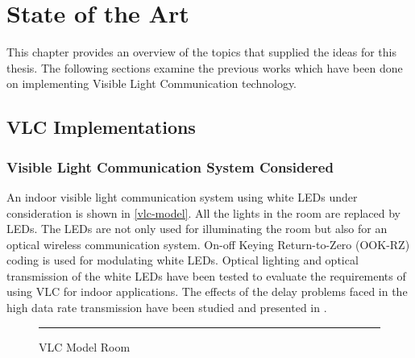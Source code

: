 
\chapter{State of the Art} %

\label{SoA} %


This chapter provides an overview of the topics that supplied the ideas for this thesis. The
following sections examine the previous works which have been done on implementing
Visible Light Communication technology.


\section{VLC Implementations}

\subsection{Visible Light Communication System Considered}

An indoor visible light communication system using white LEDs under consideration is
shown in \ref{vlc-model}. All the lights in the room are replaced by LEDs. The LEDs
are not only used for illuminating the room but also for an optical wireless
communication system. On-off Keying Return-to-Zero (OOK-RZ) coding is used for
modulating white LEDs. Optical lighting and optical transmission of the white LEDs
have been tested to evaluate the requirements of using VLC for indoor applications. The
effects of the delay problems faced in the high data rate transmission have been studied
and presented in .

\begin{figure}[htbp]
  \centering
    \rule{35em}{0.5pt}
  \caption[VLC Model Room]{VLC Model Room}
  \label{fig:vlc-model}
\end{figure}

